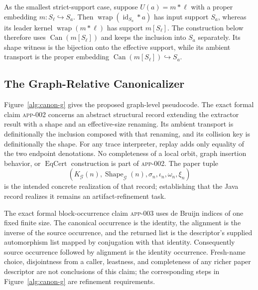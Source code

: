 As the smallest strict-support case, suppose
$U(a)=m*\ell$ with a proper embedding $m:S_\ell\hookrightarrow S_a$.
Then $\operatorname{wrap}(\operatorname{id}_{S_a}*a)$ has input support $S_a$,
whereas its leader kernel $\operatorname{wrap}(m*\ell)$ has support
$m[S_\ell]$.  The construction below therefore uses
$\operatorname{Can}(m[S_\ell])$ and keeps
the inclusion into $S_a$ separately.  Its shape witness is the bijection onto
the effective support, while its ambient transport is the proper embedding
$\operatorname{Can}(m[S_\ell])\hookrightarrow S_a$.

\subsection{The Graph-Relative Canonicalizer}
\label{app:canon-g}

Figure~\ref{alg:canon-g} gives the proposed graph-level pseudocode.  The exact
formal claim \textsc{app-002} concerns an abstract structural record extending
the extractor result with a shape and an effective-size renaming.  Its ambient
transport is definitionally the inclusion composed with that renaming, and its
collision key is definitionally the shape.  For any trace interpreter, replay
adds only equality of the two endpoint denotations.  No completeness of a
local orbit, graph insertion behavior, or $\operatorname{EqCert}$ construction
is part of \textsc{app-002}.  The paper tuple
\[
  (K_{\mathcal G}(n),\operatorname{Shape}_{\mathcal G}(n),\sigma_n,
   \iota_n,\omega_n,\xi_n)
\]
is the intended concrete realization of that record; establishing that the
Java record realizes it remains an artifact-refinement task.

The exact formal block-occurrence claim \textsc{app-003} uses de Bruijn
indices of one fixed finite size.  The canonical occurrence is the identity,
the alignment is the inverse of the source occurrence, and the returned list
is the descriptor's supplied automorphism list mapped by conjugation with that
identity.  Consequently source occurrence followed by alignment is the
identity occurrence.  Fresh-name choice, disjointness from a caller, leastness,
and completeness of any richer paper descriptor are not conclusions of this
claim; the corresponding steps in Figure~\ref{alg:canon-g} are refinement
requirements.

